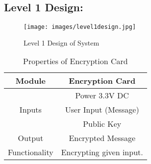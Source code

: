 \documentclass[12pt]{article}
\begin{document}
	\subsection{Level 1 Design:}

	\begin{figure}[H]
		\centering
		\label{Level 1 Design of System }
		\texttt{[image: images/level1design.jpg]}\\[0.5 cm]	
		\caption{Level 1 Design of System } 		
	\end{figure}
	

\begin{table}[h]

	\centering
	
	\label{Properties of Encryption Card}
	\begin{tabular}{|c|c|}
		\hline
		Module & Encryption Card \\ \hline
		\multirow{3}{*}{Inputs} & Power 3.3V DC \\
		\cline{2-2}
		& User Input (Message) \\
		\cline{2-2}
		& Public Key \\ \hline
		Output & Encrypted Message \\ \hline
		Functionality & Encrypting given input.\\ \hline		
	\end{tabular}
	\caption{Properties of Encryption Card}

\end{table}
\end{document}
